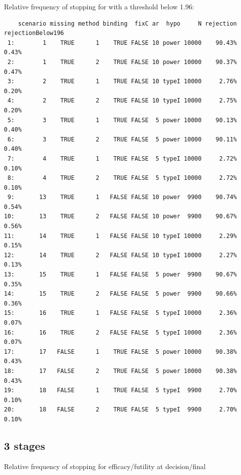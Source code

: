 \documentclass[12pt]{article}
\begin{document}
Relative frequency of stopping for with a threshold below 1.96:
\begin{verbatim}
    scenario missing method binding  fixC ar  hypo     N rejection rejectionBelow196
 1:        1    TRUE      1    TRUE FALSE 10 power 10000    90.43%             0.43%
 2:        1    TRUE      2    TRUE FALSE 10 power 10000    90.37%             0.47%
 3:        2    TRUE      1    TRUE FALSE 10 typeI 10000     2.76%             0.20%
 4:        2    TRUE      2    TRUE FALSE 10 typeI 10000     2.75%             0.20%
 5:        3    TRUE      1    TRUE FALSE  5 power 10000    90.13%             0.40%
 6:        3    TRUE      2    TRUE FALSE  5 power 10000    90.11%             0.40%
 7:        4    TRUE      1    TRUE FALSE  5 typeI 10000     2.72%             0.10%
 8:        4    TRUE      2    TRUE FALSE  5 typeI 10000     2.72%             0.10%
 9:       13    TRUE      1   FALSE FALSE 10 power  9900    90.74%             0.54%
10:       13    TRUE      2   FALSE FALSE 10 power  9900    90.67%             0.56%
11:       14    TRUE      1   FALSE FALSE 10 typeI 10000     2.29%             0.15%
12:       14    TRUE      2   FALSE FALSE 10 typeI 10000     2.27%             0.13%
13:       15    TRUE      1   FALSE FALSE  5 power  9900    90.67%             0.35%
14:       15    TRUE      2   FALSE FALSE  5 power  9900    90.66%             0.36%
15:       16    TRUE      1   FALSE FALSE  5 typeI 10000     2.36%             0.07%
16:       16    TRUE      2   FALSE FALSE  5 typeI 10000     2.36%             0.07%
17:       17   FALSE      1    TRUE FALSE  5 power 10000    90.38%             0.43%
18:       17   FALSE      2    TRUE FALSE  5 power 10000    90.38%             0.43%
19:       18   FALSE      1    TRUE FALSE  5 typeI  9900     2.70%             0.10%
20:       18   FALSE      2    TRUE FALSE  5 typeI  9900     2.70%             0.10%
\end{verbatim}

\clearpage

\subsection{3 stages}
\label{sec:orge012e50}
Relative frequency of stopping for efficacy/futility at decision/final
\end{document}
